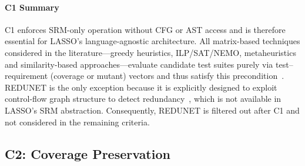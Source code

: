\begin{appendices}
\paragraph*{C1 Summary}

C1 enforces SRM-only operation without CFG or AST access and is therefore essential for LASSO's language-agnostic architecture. All matrix-based techniques considered in the literature—greedy heuristics, ILP/SAT/NEMO, metaheuristics and similarity-based approaches—evaluate candidate test suites purely via test--requirement (coverage or mutant) vectors and thus satisfy this precondition~\cite{harrold1993,yoo2012,noemmer2020,khan2020,wei2017}. REDUNET is the only exception because it is explicitly designed to exploit control-flow graph structure to detect redundancy~\cite{mongiovi2020}, which is not available in LASSO's SRM abstraction. Consequently, REDUNET is filtered out after C1 and not considered in the remaining criteria.

\subsection{C2: Coverage Preservation}\label{app:c2}


\end{appendices}

